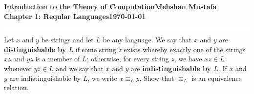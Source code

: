 \documentclass[11pt]{article}
\newcommand{\myname}{Mehshan Mustafa}
\newcommand{\dated}{\today}
\newenvironment{problem}[2][Problem]{\begin{trivlist}
\item[\hskip \labelsep {\bfseries #1}\hskip \labelsep {\bfseries #2.}]}{\end{trivlist}}
\begin{document}
\textbf{Introduction to the Theory of
Computation}\hfill\textbf{\myname}\\[0.01in]
\textbf{Chapter 1: Reqular Languages}\hfill\textbf{\dated}\\
\smallskip\hrule\bigskip

\begin{problem}{1.51}
Let $x$ and $y$ be strings and let $L$ be any language. We say that $x$ and $y$ are \textbf{distinguishable by $L$} if some string $z$ exists whereby exactly one of the strings $xz$ and $yz$ is a member of $L$; otherwise, for every string $z$, we have $xz \in L$ whenever $yz \in L$ and we say that $x$ and $y$ are \textbf{indistinguishable by $L$}. If $x$ and $y$ are indistinguishable by $L$, we write $x \equiv_{L} y$. Show that $\equiv_{L}$ is an equivalence relation.
\end{problem}
\end{document}
